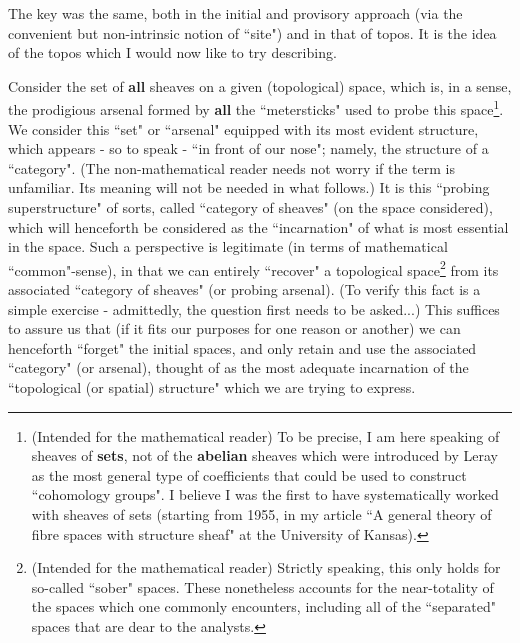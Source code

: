 The key was the same, both in the initial and provisory approach (via the convenient but non-intrinsic notion of ``site") and in that of topos. It is the idea of the topos which I would now like to try describing.

Consider the set of \textbf{all} sheaves on a given (topological) space, which is, in a sense, the prodigious arsenal formed by \textbf{all} the ``metersticks" used to probe this space\footnote{(Intended for the mathematical reader) To be precise, I am here speaking of sheaves of \textbf{sets}, not of the \textbf{abelian} sheaves which were introduced by Leray as the most general type of coefficients that could be used to construct ``cohomology groups". I believe I was the first to have systematically worked with sheaves of sets (starting from 1955, in my article ``A general theory of fibre spaces with structure sheaf" at the University of Kansas).}. We consider this ``set" or ``arsenal" equipped with its most evident structure, which appears - so to speak - ``in front of our nose"; namely, the structure of a ``category". (The non-mathematical reader needs not worry if the term is unfamiliar. Its meaning will not be needed in what follows.) It is this ``probing superstructure" of sorts, called ``category of sheaves" (on the space considered), which will henceforth be considered as the ``incarnation" of what is most essential in the space. Such a perspective is legitimate (in terms of mathematical ``common"-sense), in that we can entirely ``recover" a topological space\footnote{(Intended for the mathematical reader) Strictly speaking, this only holds for so-called ``sober" spaces. These nonetheless accounts for the near-totality of the spaces which one commonly encounters, including all of the ``separated" spaces that are dear to the analysts.} from its associated ``category of sheaves" (or probing arsenal). (To verify this fact is a simple exercise - admittedly, the question first needs to be asked...) This suffices to assure us that (if it fits our purposes for one reason or another) we can henceforth ``forget" the initial spaces, and only retain and use the associated ``category" (or arsenal), thought of as the most adequate incarnation of the ``topological (or spatial) structure" which we are trying to express.

